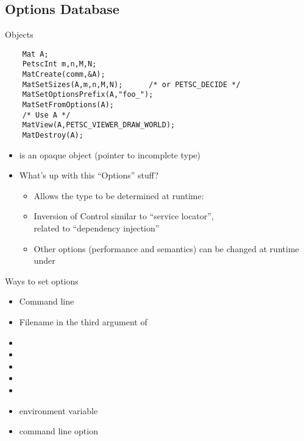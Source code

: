 \subsection{Options Database}
\begin{frame}[fragile]{Objects}
  \begin{verbatim}
    Mat A;
    PetscInt m,n,M,N;
    MatCreate(comm,&A);
    MatSetSizes(A,m,n,M,N);      /* or PETSC_DECIDE */ 
    MatSetOptionsPrefix(A,"foo_");
    MatSetFromOptions(A);
    /* Use A */
    MatView(A,PETSC_VIEWER_DRAW_WORLD);
    MatDestroy(A);
  \end{verbatim}
  \begin{itemize}
  \item {} is an opaque object (pointer to incomplete type)
  \item What's up with this ``Options'' stuff?
    \begin{itemize}
    \item Allows the type to be determined at runtime: 
    \item Inversion of Control similar to ``service locator'', \\
      related to ``dependency injection''
    \item Other options (performance and semantics) can be changed at
      runtime under 
    \end{itemize}
  \end{itemize}
\end{frame}



\begin{frame}{Ways to set options}
  \begin{itemize}
  \item Command line
  \item Filename in the third argument of 
  \item {}
  \item {}
  \item {}
  \item {}
  \item {}
  \item {} environment variable
  \item command line option 
  \end{itemize}
\end{frame}

